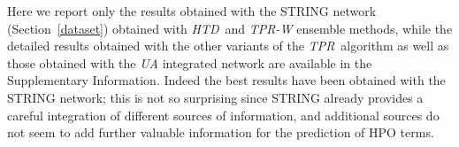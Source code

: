 \documentclass{bioinfo}
\newcommand{\htd}{{\em HTD}}
\newcommand{\tpr}{{\em TPR}}
\begin{document}


Here we report only the results obtained with the STRING  network (Section~\ref{dataset}) obtained with \htd~and {\em TPR-W} ensemble methods, while the detailed results obtained with the other variants of the \tpr~algorithm as well as those obtained with the {\em UA} integrated network are available in the Supplementary Information. Indeed the best results have been obtained with the STRING network; this is not so surprising since STRING already provides a careful integration of different sources of information, and additional sources do not seem to add further valuable information  for the prediction of HPO terms.
\end{document}
